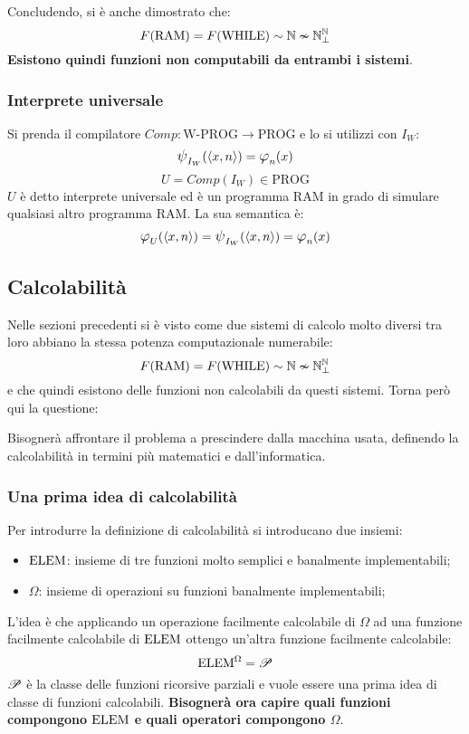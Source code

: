 Concludendo, si è anche dimostrato che:
$$ F(\text{RAM})=F(\text{WHILE}) \sim \mathbb{N} \nsim \mathbb{N}^{\mathbb{N}}_\perp $$
\textbf{Esistono quindi funzioni non computabili da entrambi i sistemi}.

\subsubsection{Interprete universale}\label{sec:interpreteU}
Si prenda il compilatore $Comp:\text{W-PROG}\to\text{PROG}$ e lo si utilizzi con $I_W$:
$$ \semWHILE_{I_W}(\cantor{x,n})=\semRAM_n(x) $$
$$ U = Comp(I_W)\in\text{PROG} $$
$U$ è detto interprete universale ed è un programma RAM in grado di simulare qualsiasi
altro programma RAM.
La sua semantica è:
$$ \semRAM_U(\cantor{x,n})=\semWHILE_{I_W}(\cantor{x,n})=\semRAM_n(x) $$

\subsection{Calcolabilità}
Nelle sezioni precedenti si è visto come due sistemi di calcolo molto diversi tra loro 
abbiano la stessa potenza computazionale numerabile:
$$ F(\text{RAM}) = F(\text{WHILE}) \sim \mathbb{N} \nsim \mathbb{N}^{\mathbb{N}}_\perp$$
e che quindi esistono delle funzioni non calcolabili da questi sistemi. Torna però qui la
questione: 

Bisognerà affrontare il problema a prescindere dalla macchina usata, definendo la 
calcolabilità in termini più matematici e  dall'informatica.

\subsubsection{Una prima idea di calcolabilità}
Per introdurre la definizione  di calcolabilità si introducano due insiemi:
\begin{itemize}
    \item $\text{ELEM}$: insieme di tre funzioni molto semplici e banalmente implementabili;
    \item $\Omega$: insieme di operazioni su funzioni banalmente implementabili;
\end{itemize}

L'idea è che applicando un operazione facilmente calcolabile di $\Omega$ ad una funzione
facilmente calcolabile di $\text{ELEM}$ ottengo un'altra funzione facilmente calcolabile:
$$ \text{ELEM}^\Omega = \mathscr{P} $$
$\mathscr{P}$ è la classe delle funzioni ricorsive parziali e vuole essere una prima 
idea di classe di funzioni calcolabili. \textbf{Bisognerà ora capire quali funzioni compongono 
$\text{ELEM}$ e quali operatori compongono $\Omega$}.

